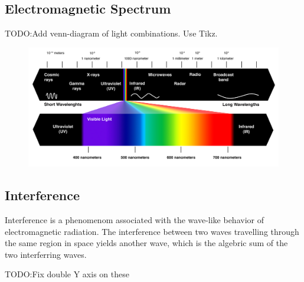 \documentclass{article}[10pt]
\begin{document}
\subsection{Electromagnetic Spectrum}
TODO:\@ Add venn-diagram of light combinations. Use Tikz.
\begin{figure}[H]
	\centering
	\includegraphics[scale=0.65]{radiations}
\end{figure}
\subsection{Interference}
Interference is a phenomenom associated with the wave-like behavior of
electromagnetic radiation. The interference between two waves travelling through
the same region in space yields another wave, which is the algebric sum of the
two interferring waves.

TODO:\@ Fix double Y axis on these
\end{document}
